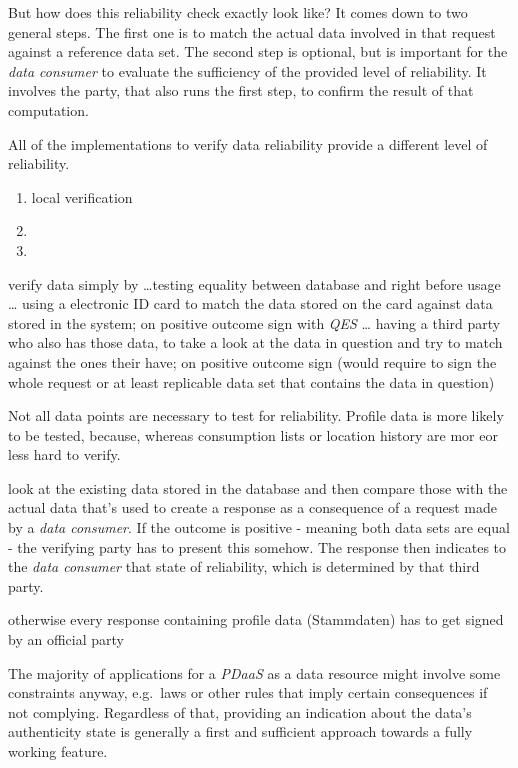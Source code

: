 \documentclass[12pt,english,a4paper,titlepage,cleardoublepage=empty,dottedtoc]{report}
\begin{document}
But how does this reliability check exactly look like? It comes down to
two general steps. The first one is to match the actual data involved in
that request against a reference data set. The second step is optional,
but is important for the \emph{data consumer} to evaluate the
sufficiency of the provided level of reliability. It involves the party,
that also runs the first step, to confirm the result of that
computation.

All of the implementations to verify data reliability provide a
different level of reliability.

\begin{enumerate}
\def\labelenumi{(\arabic{enumi})}
\item
  local verification
\item
\item
\end{enumerate}

verify data simply by \ldots{}testing equality between database and
right before usage \ldots{} using a electronic ID card to match the data
stored on the card against data stored in the system; on positive
outcome sign with \emph{QES} \ldots{} having a third party who also has
those data, to take a look at the data in question and try to match
against the ones their have; on positive outcome sign (would require to
sign the whole request or at least replicable data set that contains the
data in question)

Not all data points are necessary to test for reliability. Profile data
is more likely to be tested, because, whereas consumption lists or
location history are mor eor less hard to verify.

look at the existing data stored in the database and then compare those
with the actual data that's used to create a response as a consequence
of a request made by a \emph{data consumer}. If the outcome is positive
- meaning both data sets are equal - the verifying party has to present
this somehow. The response then indicates to the \emph{data consumer}
that state of reliability, which is determined by that third party.

otherwise every response containing profile data (Stammdaten) has to get
signed by an official party

The majority of applications for a \emph{PDaaS} as a data resource might
involve some constraints anyway, e.g.~laws or other rules that imply
certain consequences if not complying. Regardless of that, providing an
indication about the data's authenticity state is generally a first and
sufficient approach towards a fully working feature.
\end{document}
